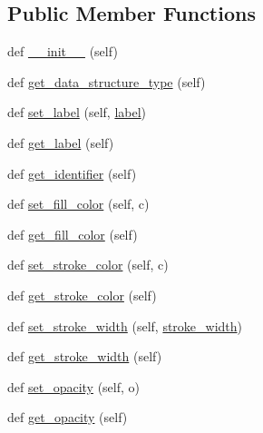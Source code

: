 \subsection*{Public Member Functions}
\begin{DoxyCompactItemize}
\item 
def \mbox{\hyperlink{classbridges_1_1symbol_1_1_symbol_a57c7fcd41baccb9c2e15c9c828d957f6}{\+\_\+\+\_\+init\+\_\+\+\_\+}} (self)
\item 
def \mbox{\hyperlink{classbridges_1_1symbol_1_1_symbol_a0d68555d5ddfba992207249381c8f019}{get\+\_\+data\+\_\+structure\+\_\+type}} (self)
\item 
def \mbox{\hyperlink{classbridges_1_1symbol_1_1_symbol_aa1d1e9826d06041e87e19386e4df84c0}{set\+\_\+label}} (self, \mbox{\hyperlink{classbridges_1_1symbol_1_1_symbol_a99c341040ad20f6059d10f065c3ddd44}{label}})
\item 
def \mbox{\hyperlink{classbridges_1_1symbol_1_1_symbol_a6cfe830d22061c3a8d6bd6401bf29f57}{get\+\_\+label}} (self)
\item 
def \mbox{\hyperlink{classbridges_1_1symbol_1_1_symbol_a01279c354515b3dafc6a212d0d1f3474}{get\+\_\+identifier}} (self)
\item 
def \mbox{\hyperlink{classbridges_1_1symbol_1_1_symbol_a4bed431ac9edc767c3240f407363fc89}{set\+\_\+fill\+\_\+color}} (self, c)
\item 
def \mbox{\hyperlink{classbridges_1_1symbol_1_1_symbol_a9f76ad0840f987e851a329c4fe3ef120}{get\+\_\+fill\+\_\+color}} (self)
\item 
def \mbox{\hyperlink{classbridges_1_1symbol_1_1_symbol_a55932185db5b2ffc4c81209f75d4a72c}{set\+\_\+stroke\+\_\+color}} (self, c)
\item 
def \mbox{\hyperlink{classbridges_1_1symbol_1_1_symbol_ab325e911f439023fa122e1d1817f56f3}{get\+\_\+stroke\+\_\+color}} (self)
\item 
def \mbox{\hyperlink{classbridges_1_1symbol_1_1_symbol_a68baf681563e61d6e4fb878c68dce6c0}{set\+\_\+stroke\+\_\+width}} (self, \mbox{\hyperlink{classbridges_1_1symbol_1_1_symbol_a413998c84c07b9d76402c250579b5023}{stroke\+\_\+width}})
\item 
def \mbox{\hyperlink{classbridges_1_1symbol_1_1_symbol_addbd3c725e50da39d41bc79762e25c3c}{get\+\_\+stroke\+\_\+width}} (self)
\item 
def \mbox{\hyperlink{classbridges_1_1symbol_1_1_symbol_a2877b9ff6c631d16f5c4de776bb0b3de}{set\+\_\+opacity}} (self, o)
\item 
def \mbox{\hyperlink{classbridges_1_1symbol_1_1_symbol_a3445303c47d48dca2deb3a73454d50fb}{get\+\_\+opacity}} (self)

\end{DoxyCompactItemize}
